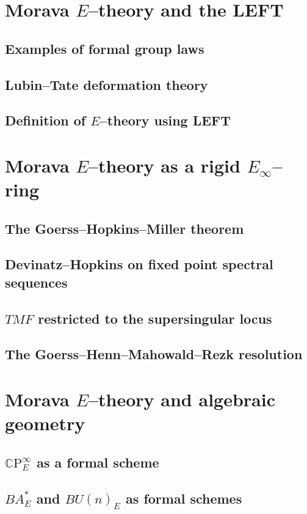 \documentclass{amsart}
\newcommand{\<}{\langle}
\renewcommand{\>}{\rangle}
\theoremstyle{plain}
\theoremstyle{definition}
\theoremstyle{remark}
\begin{document}
\section{Morava $E$--theory and the LEFT}
    \subsection{Examples of formal group laws}
    \subsection{Lubin--Tate deformation theory}
    \subsection{Definition of $E$--theory using LEFT}

\section{Morava $E$--theory as a rigid $E_\infty$--ring}
    \subsection{The Goerss--Hopkins--Miller theorem}
    \subsection{Devinatz--Hopkins on fixed point spectral sequences}
    \subsection{$TMF$ restricted to the supersingular locus}
    \subsection{The Goerss--Henn--Mahowald--Rezk resolution}

\section{Morava $E$--theory and algebraic geometry}
    \subsection{$\mathbb C \mathrm P^\infty_E$ as a formal scheme}
    \subsection{$BA^*_E$ and $BU(n)_E$ as formal schemes}
\end{document}

